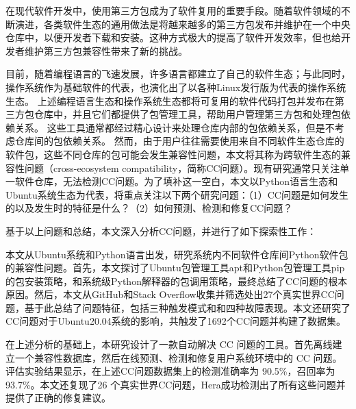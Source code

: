 \begin{cabstract}
在现代软件开发中，使用第三方包成为了软件复用的重要手段。随着软件领域的不断演进，各类软件生态的通用做法是将越来越多的第三方包发布并维护在一个中央仓库中，以便开发者下载和安装。这种方式极大的提高了软件开发效率，但也给开发者维护第三方包兼容性带来了新的挑战。

目前，随着编程语言的飞速发展，许多语言都建立了自己的软件生态；与此同时，操作系统作为基础软件的代表，也演化出了以各种Linux发行版为代表的操作系统生态。
上述编程语言生态和操作系统生态都将可复用的软件代码打包并发布在第三方包仓库中，并且它们都提供了包管理工具，帮助用户管理第三方包和处理包依赖关系。
这些工具通常都经过精心设计来处理仓库内部的包依赖关系，但是不考虑仓库间的包依赖关系。
然而，由于用户往往需要使用来自不同软件生态仓库的软件包，这些不同仓库的包可能会发生兼容性问题，本文将其称为跨软件生态的兼容性问题（cross-ecosystem compatibility，简称CC问题）。现有研究通常只关注单一软件仓库，无法检测CC问题。为了填补这一空白，本文以Python语言生态和Ubuntu系统生态为代表，将重点关注以下两个研究问题：（1）CC问题是如何发生的以及发生时的特征是什么？（2）如何预测、检测和修复CC问题？

基于以上问题和总结，本文深入分析CC问题，并进行了如下探索性工作：
\begin{compactitem}
	\item 本文从Ubuntu系统和Python语言出发，研究系统内不同软件仓库间Python软件包的兼容性问题。首先，本文探讨了Ubuntu包管理工具apt和Python包管理工具pip的包安装策略，和系统级Python解释器的包调用策略，最终总结了CC问题的根本原因。然后，本文从GitHub和Stack Overflow收集并筛选处出27个真实世界CC问题，基于此总结了问题特征，包括三种触发模式和和四种故障表现。本文还研究了CC问题对于Ubuntu20.04系统的影响，共触发了1692个CC问题并构建了数据集。
	\item 在上述分析的基础上，本研究设计了一款自动解决 CC 问题的工具\tool{}。\tool{}首先离线建立一个兼容性数据库，然后在线预测、检测和修复用户系统环境中的 CC 问题。评估实验结果显示，\tool{}在上述CC问题数据集上的检测准确率为 90.5\%，召回率为 93.7\%。本文还复现了26 个真实世界CC问题，Hera成功检测出了所有这些问题并提供了正确的修复建议。
\end{compactitem}
\end{cabstract}

\newpage
\mbox{}
\newpage

